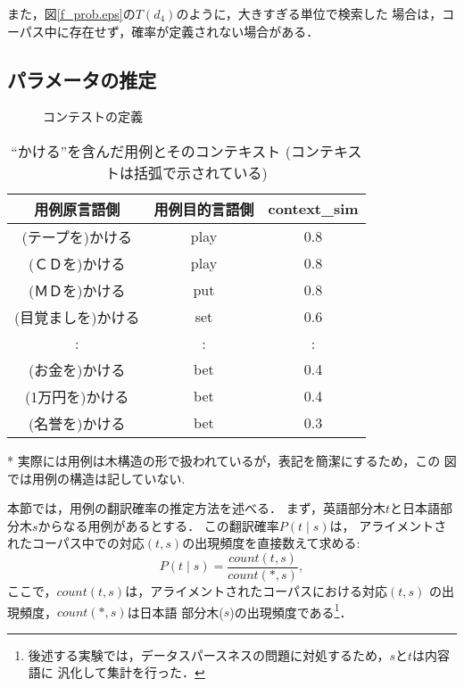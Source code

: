 また，図\ref{f_prob.eps}の$T(d_{4})$のように，大きすぎる単位で検索した
場合は，コーパス中に存在せず，確率が定義されない場合がある．



\subsection{パラメータの推定}




\begin{figure}
\begin{center}
    \epsfxsize=75mm
\end{center}
\caption{コンテストの定義}
\label{f_cs.eps}
\end{figure}


\begin{table}
\caption{``かける''を含んだ用例とそのコンテキスト (コンテキス
	  トは括弧で示されている)}
\label{tc0}
\begin{center}
\begin{tabular}{ccc}
\hline   用例原言語側 & 用例目的言語側 & context\_sim \\
\hline
	(テープを)かける& play & 0.8				\\
	(ＣＤを)かける  & play & 0.8				\\
	(ＭＤを)かける  & put  & 0.8				\\
	(目覚ましを)かける& set  & 0.6				\\
            :           &  :   &  : \\
	(お金を)かける  & bet  & 0.4				\\
	(1万円を)かける& bet  & 0.4				\\
	(名誉を)かける  & bet  & 0.3				\\
\hline
\end{tabular}
\end{center}
{\footnotesize
* 実際には用例は木構造の形で扱われているが，表記を簡潔にするため，この
図では用例の構造は記していない.
}
\end{table}

本節では，用例の翻訳確率の推定方法を述べる．
まず，英語部分木$t$と日本語部分木$s$からなる用例があるとする．
この翻訳確率$P(t \mid s)$は，
アライメントされたコーパス中での対応$(t,s)$の出現頻度を直接数えて求める:
\begin{equation}
       P(t \mid s) = \frac{ count (t,s) }{ count (*,s)  },
\end{equation}
ここで，$count(t,s)$は，アライメントされたコーパスにおける対応$(t,s)$
の出現頻度，$count(*,s)$は日本語
部分木($s$)の出現頻度である\footnote
{後述する実験では，データスパースネスの問題に対処するため，$s$と$t$は内容語に
  汎化して集計を行った．}．


